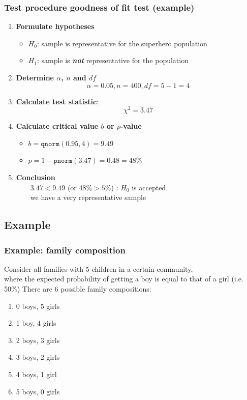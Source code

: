\documentclass{beamer}
\begin{document}
\begin{frame}
\frametitle{Test procedure goodness of fit test (example)}
\begin{enumerate}
    \item \textbf{Formulate hypotheses}
      \begin{itemize}
        \item $H_{0}$: sample is representative for the superhero population
        \item $H_{1}$: sample is \textbf{\emph{not}} representative for the population
      \end{itemize}
    \item \textbf{Determine $\alpha$, $n$ and $df$}
        \[ \alpha = 0.05 , n = 400, df = 5-1 = 4 \]
    \item \textbf{Calculate test statistic}:
        \[ \chi^{2} = 3.47 \]
    \item \textbf{Calculate critical value $b$ or $p$-value}
      \begin{itemize}
        \item $b = \texttt{qnorm}(0.95,4) = 9.49$
        \item $p = 1-\texttt{pnorm}(3.47) = 0.48 = 48\%$
      \end{itemize}
    \item \textbf{Conclusion}\\
    ~~~~$3.47 < 9.49$ (or $48\% > 5\%$) : $H_0$ is accepted\\
    ~~~~we have a very representative sample
\end{enumerate}
\end{frame}

\subsection{Example}

\begin{frame}
  \frametitle{Example: family composition}
  
  Consider all families with 5 children in a certain community,\\
  where the expected probability of getting a boy is equal to that of a girl (i.e. 50\%)
  \vfill
  \pause
  There are 6 possible family compositions:
  \begin{enumerate}
    \item 0 boys, 5 girls
    \item 1 boy, 4 girls
    \item 2 boys, 3 girls
    \item 3 boys, 2 girls
    \item 4 boys, 1 girl
    \item 5 boys, 0 girls
  \end{enumerate}

\end{frame}
\end{document}
